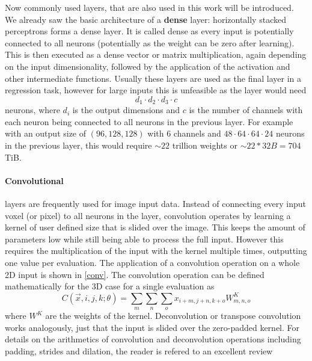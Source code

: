 Now commonly used layers, that are also used in this work will be introduced.
We already saw the basic architecture of a \textbf{dense} layer: horizontally stacked perceptrons forms a dense layer.
It is called dense as every input is potentially connected to all neurons (potentially as the weight can be zero after learning).
This is then executed as a dense vector or matrix multiplication, again depending on the input dimensionality, followed by the application of the activation and other intermediate functions.
Usually these layers are used as the final layer in a regression task, however for large inputs this is unfeasible as the layer would need
\[ d_1 \cdot d_2 \cdot d_3  \cdot c \]
neurons, where $d_i$ is the output dimensions and $c$ is the number of channels with each neuron being connected to all neurons in the previous layer.
For example with an output size of $(96, 128, 128)$ with $6$ channels and $48 \cdot 64 \cdot 64 \cdot 24$ neurons in the previous layer, this would require $\sim22$ trillion weights or $\sim22 * 32B = 704$ TiB.

\paragraph{Convolutional} layers are frequently used for image input data.
Instead of connecting every input voxel (or pixel) to all neurons in the layer, convolution operates by learning a kernel of user defined size that is slided over the image.
This keeps the amount of parameters low while still being able to process the full input.
However this requires the multiplication of the input with the kernel multiple times, outputting one value per evaluation.
The application of a convolution operation on a whole 2D input is shown in \ref{conv}.
The convolution operation can be defined mathematically for the 3D case for a single evaluation as
\[ C(\overrightarrow{x}, i, j, k; \theta) = \sum_m \sum_n \sum_o x_{i + m, j+n, k+o} W^K_{m, n, o} \]
where $W^K$ are the weights of the kernel.
Deconvolution or transpose convolution works analogously, just that the input is slided over the zero-padded kernel.
For details on the arithmetics of convolution and deconvolution operations including padding, strides and dilation, the reader is refered to an excellent review~\autocite{dumoulin_guide_2018}


